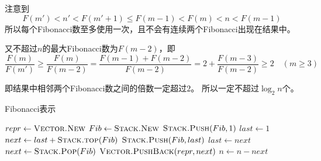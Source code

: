 \begin{questions}
\begin{solution}
        注意到\[
            F(m') < n' < F(m' + 1) \le F(m-1) < F(m) < n < F(m-1)
        \]
        所以每个Fibonacci数至多使用一次，且不会有连续两个Fibonacci出现在结果中。

        又不超过$n$的最大Fibonacci数为$F(m-2)$，即\[
            \frac{F(m)}{F(m')}
            \ge \frac{F(m)}{F(m-2)}
            = \frac{F(m-1) + F(m-2)}{F(m-2)} = 2 + \frac{F(m-3)}{F(m-2)}
            \ge 2
            \quad (m \ge 3)
        \]

        即结果中相邻两个Fibonacci数之间的倍数一定超过$2$。
        所以一定不超过$\log_2{n}$个。

    \end{solution}

    \begin{algorithm}[!htp]
        \caption{Fibonacci表示}\label{alg:0430:3}
        \begin{algorithmic}[1]
            \State $repr \gets \Call{Vector.New}{}$
            \State $Fib \gets \Call{Stack.New}{}$
            \State $\Call{Stack.Push}{Fib, 1}$
            \State $last \gets 1$
            \Repeat
            \State $next \gets last + \Call{Stack.top}{Fib}$
            \State $\Call{Stack.Push}{Fib, last}$
            \State $last \gets next$
            \Repeat
            \State $next \gets \Call{Stack.Pop}{Fib}$
            \State $\Call{Vector.PushBack}{repr, next}$
            \State $n \gets n - next$
            \EndIf
        \end{algorithmic}
    \end{algorithm}

\end{questions}
